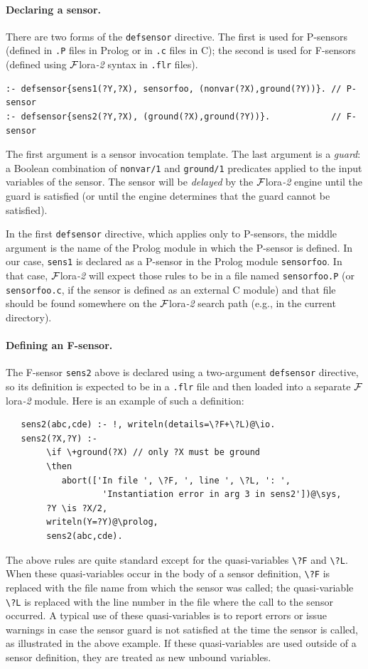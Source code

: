 \documentclass[11pt]{article}
\newcommand{\FLORA}{{\mbox{\sc ${\cal F}${lora}\rm\emph{-2}}}\xspace}
\newcommand{\FLSYSTEM}{\FLORA}
\newcommand{\flrext}{flr\xspace}
\newcommand{\bs}{\textbackslash}
\begin{document}
\paragraph{Declaring a sensor.}
There are two forms of the \texttt{defsensor} directive. The first is used for
P-sensors (defined in \texttt{.P} files in Prolog or in \texttt{.c} files
in C); the second is used for
F-sensors (defined using \FLSYSTEM syntax in \texttt{.\flrext} files).
\begin{verbatim}
:- defsensor{sens1(?Y,?X), sensorfoo, (nonvar(?X),ground(?Y))}. // P-sensor
:- defsensor{sens2(?Y,?X), (ground(?X),ground(?Y))}.            // F-sensor
\end{verbatim}
The first argument is a sensor invocation template.  The last argument
is a \emph{guard}: a Boolean combination of \texttt{nonvar/1} and
\texttt{ground/1} predicates applied to the input variables of the
sensor. The sensor will be \emph{delayed} by the \FLSYSTEM engine until the
guard is satisfied (or until the engine determines that the guard cannot be
satisfied).

In the first \texttt{defsensor} directive, which applies only to P-sensors,
the middle argument is the name
of the Prolog module in which the P-sensor is defined. 
In our case, \texttt{sens1} is declared as a P-sensor
in the Prolog module \texttt{sensorfoo}. In that case, \FLSYSTEM
will expect those rules to be in a file named \texttt{sensorfoo.P}
(or \texttt{sensorfoo.c}, if the sensor is defined as an external C module)
and that file should be found somewhere on the \FLSYSTEM search path (e.g., in
the current directory).

\paragraph{Defining an F-sensor.}
The F-sensor \texttt{sens2} above is declared using a
two-argument \texttt{defsensor}  directive, so its definition is expected to be in a
\texttt{.\flrext} file and then loaded into a separate \FLSYSTEM module.
Here is an example of such a definition:
\begin{verbatim}
   sens2(abc,cde) :- !, writeln(details=\?F+\?L)@\io.
   sens2(?X,?Y) :-
        \if \+ground(?X) // only ?X must be ground
        \then
           abort(['In file ', \?F, ', line ', \?L, ': ',
                   'Instantiation error in arg 3 in sens2'])@\sys,
        ?Y \is ?X/2,
        writeln(Y=?Y)@\prolog,
        sens2(abc,cde).
\end{verbatim}
The above rules are quite standard except for the quasi-variables
\texttt{\bs{}?F} and \texttt{\bs{}?L}. When these quasi-variables occur in the body of a
sensor definition, \texttt{\bs{}?F} is replaced with the file name from which
the sensor was called; the quasi-variable \texttt{\bs{}?L} is replaced with the line
number in the file where the call to the sensor occurred.
A typical use of these quasi-variables is to report errors or issue warnings in case
the sensor guard is not satisfied at the time the sensor is called, as
illustrated in the above example.
If these quasi-variables are used outside of a sensor definition, they are treated
as new unbound variables.
\end{document}
